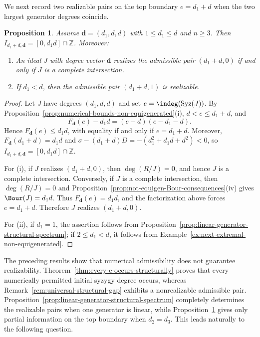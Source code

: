 \documentclass[11pt]{amsart} %
\newtheorem{Proposition}[Theorem]{Proposition}
\theoremstyle{definition}
\def\syz{\mbox{\rm Syz}}
\begin{document}
We next record two realizable pairs on the top boundary $e=d_1+d$ when the
two largest generator degrees coincide.
\begin{Proposition}\label{prop:top-boundary-structural-spectrum}
Assume $\mathbf d=(d_1,d,d)$ with $1\le d_1\le d$ and $n\ge3$. Then
$I_{d_1+d,\mathbf d}=[0,d_1d]\cap\mathbb Z$. Moreover:
\begin{enumerate}
\item[\rm(i)] An ideal $J$ with degree vector $\mathbf d$ realizes the
admissible pair $(d_1+d,0)$ if and only if $J$ is a complete intersection.
\item[\rm(ii)] If $d_1<d$, then the admissible pair $(d_1+d,1)$ is realizable.
\end{enumerate}
\end{Proposition}
\begin{proof}
Let $J$ have degrees $(d_1,d,d)$ and set $e=\indeg(\syz(J))$. By
Proposition~\ref{prop:numerical-bounds-non-equigenerated}{\rm(i)},
$d<e\le d_1+d$, and
\[
F_{\mathbf d}(e)-d_1d=(e-d)(e-d_1-d).
\]
Hence $F_{\mathbf d}(e)\le d_1d$, with equality if and only if
$e=d_1+d$. Moreover, $F_{\mathbf d}(d_1+d)=d_1d$ and
$\sigma-(d_1+d)D=-(d_1^2+d_1d+d^2)<0$, so
$I_{d_1+d,\mathbf d}=[0,d_1d]\cap\mathbb Z$.

For {\rm(i)}, if $J$ realizes $(d_1+d,0)$, then $\deg(R/J)=0$, and hence
$J$ is a complete intersection. Conversely, if $J$ is a complete
intersection, then $\deg(R/J)=0$ and
Proposition~\ref{prop:not-equigen-Bour-consequences}{\rm(iv)} gives
$\Bour(J)=d_1d$. Thus $F_{\mathbf d}(e)=d_1d$, and the factorization above
forces $e=d_1+d$. Therefore $J$ realizes $(d_1+d,0)$.

For {\rm(ii)}, if $d_1=1$, the assertion follows from
Proposition~\ref{prop:linear-generator-structural-spectrum}; if
$2\le d_1<d$, it follows from
Example~\ref{ex:next-extremal-non-equigenerated}.
\end{proof}
The preceding results show that numerical admissibility does not guarantee
realizability. Theorem~\ref{thm:every-e-occurs-structurally} proves that every
numerically permitted initial syzygy degree occurs, whereas
Remark~\ref{rem:universal-structural-gap} exhibits a nonrealizable admissible
pair. Proposition~\ref{prop:linear-generator-structural-spectrum} completely
determines the realizable pairs when one generator is linear, while
Proposition~\ref{prop:top-boundary-structural-spectrum} gives only partial
information on the top boundary when $d_2=d_3$. This leads naturally to the
following question.
\end{document}
